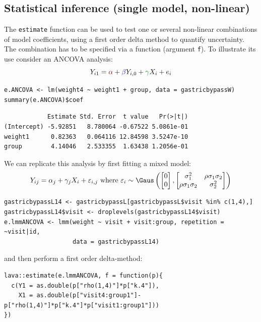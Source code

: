 \documentclass[12pt]{article}
\newcommand{\darkblue}{blue!80!black}
\newcommand{\darkgreen}{green!50!black}
\newcommand{\darkred}{red!50!black}
\begin{document}
\clearpage

\subsection{Statistical inference (single model, non-linear)}
\label{sec:orgbdfbcb2}

The \texttt{estimate} function can be used to test one or several non-linear
combinations of model coefficients, using a first order delta method
to quantify uncertainty. The combination has to be specified via a
function (argument \texttt{f}). To illustrate its use consider an ANCOVA
analysis:
\[ Y_{i1} = \textcolor{\darkred}{\alpha} + \textcolor{\darkblue}{\beta} Y_{i,0} + \textcolor{\darkgreen}{\gamma} X_{i} + e_{i} \]

\lstset{language=r,label= ,caption= ,captionpos=b,numbers=none}
\begin{lstlisting}
e.ANCOVA <- lm(weight4 ~ weight1 + group, data = gastricbypassW)
summary(e.ANCOVA)$coef
\end{lstlisting}

\begin{verbatim}
            Estimate Std. Error  t value   Pr(>|t|)
(Intercept) -5.92851   8.780064 -0.67522 5.0861e-01
weight1      0.82363   0.064116 12.84598 3.5247e-10
group        4.14046   2.533355  1.63438 1.2056e-01
\end{verbatim}


We can replicate this analysis by first fitting a mixed model:
\[ Y_{ij} = \alpha_j + \gamma_j X_{i} + \varepsilon_{i,j} \text{ where } \varepsilon_i \sim \Gaus \left( \begin{bmatrix} 0 \\ 0 \end{bmatrix}, \begin{bmatrix} \sigma^2_1 & \rho \sigma_1 \sigma_2 \\ \rho \sigma_1 \sigma_2 & \sigma^2_2 \end{bmatrix} \right) \]
\lstset{language=r,label= ,caption= ,captionpos=b,numbers=none}
\begin{lstlisting}
gastricbypassL14 <- gastricbypassL[gastricbypassL$visit %in% c(1,4),]
gastricbypassL14$visit <- droplevels(gastricbypassL14$visit)
e.lmmANCOVA <- lmm(weight ~ visit + visit:group, repetition = ~visit|id,
                   data = gastricbypassL14)
\end{lstlisting}

and then perform a first order delta-method:
\lstset{language=r,label= ,caption= ,captionpos=b,numbers=none}
\begin{lstlisting}
lava::estimate(e.lmmANCOVA, f = function(p){
  c(Y1 = as.double(p["rho(1,4)"]*p["k.4"]),
    X1 = as.double(p["visit4:group1"]-p["rho(1,4)"]*p["k.4"]*p["visit1:group1"]))
})
\end{lstlisting}
\end{document}
